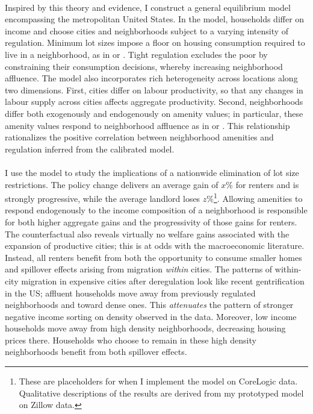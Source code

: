 \documentclass[]{article}
\begin{document}
	\paragraph*{}
	Inspired by this theory and evidence, I construct a general equilibrium model encompassing the metropolitan United States. In the model, households differ on income and choose cities and neighborhoods subject to a varying intensity of regulation. Minimum lot sizes impose a floor on housing consumption required to live in a neighborhood, as in \cite{kulka} or \cite{calabresetal}. Tight regulation excludes the poor by constraining their consumption decisions, whereby increasing neighborhood affluence. The model also incorporates rich heterogeneity across locations along two dimensions. First, cities differ on labour productivity, so that any changes in labour supply across cities affects aggregate productivity. Second, neighborhoods differ both exogenously and endogenously on amenity values; in  particular, these amenity values respond to neighborhood affluence as in \citet{parispoor} or \citet{ghh2013}. This relationship rationalizes the positive correlation between neighborhood amenities and regulation inferred from the calibrated model.

	\paragraph*{}
	I use the model to study the implications of a nationwide elimination of lot size restrictions. The policy change delivers an average gain of $x \%$ for renters and is strongly progressive, while the average landlord loses $z \%$\footnote{These are placeholders for when I implement the model on CoreLogic data. Qualitative descriptions of the results are derived from my prototyped model on Zillow data.}. Allowing amenities to  respond endogenously to the income composition of a neighborhood is responsible for both higher aggregate gains and the progressivity of those gains for renters. The counterfactual also reveals virtually no welfare gains associated with the expansion of productive cities; this is at odds with the macroeconomic literature. Instead, all renters benefit from both the opportunity to consume smaller homes and spillover effects arising from migration \textit{within} cities. The patterns of within-city migration in expensive cities after deregulation look like recent gentrification in the US; affluent households move away from previously regulated neighborhoods and toward dense ones. This \textit{attenuates} the pattern of stronger negative income sorting on density observed in the data. Moreover, low income households move away from high density neighborhoods, decreasing housing prices there. Households who choose to remain in these high density neighborhoods benefit from both
	 spillover effects. 
	
\end{document}
